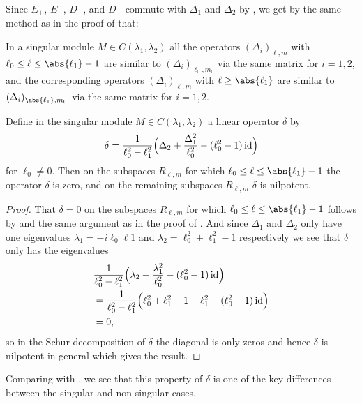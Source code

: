 Since $E_+$, $E_-$, $D_+$, and $D_-$ commute with $\Delta_1$ and $\Delta_2$ by , we get by the same method as in the proof of  that:

\begin{lemma}\label{lem:singmodDeltasimilar}
  In a singular module $M\in C(\lambda_1,\lambda_2)$ all the operators $(\Delta_i)_{\ell,m}$ with $\ell_0\leq \ell\leq \abs{\ell_1}-1$ are similar to $(\Delta_i)_{\ell_0,m_0}$ via the same matrix for $i=1,2$, and the corresponding operators $(\Delta_i)_{\ell,m}$ with $\ell\geq \abs{\ell_1}$ are similar to $(\Delta_i)_{\abs{\ell_1},m_0}$ via the same matrix for $i=1,2$.
\end{lemma}

\begin{lemma}\label{lem:Deltarelsing}
  Define in the singular module $M\in C(\lambda_1,\lambda_2)$ a linear operator $\delta$ by
  \begin{align}
    \delta = \dfrac{1}{\ell_0^2-\ell_1^2}\Bigl( \Delta_2 + \dfrac{\Delta_1^2}{\ell_0^2} - (\ell_0^2-1)\operatorname{id} \Bigr)
  \end{align}
  for $\ell_0\neq 0$. Then on the subspaces $R_{\ell,m}$ for which $\ell_0\leq \ell\leq \abs{\ell_1}-1$ the operator $\delta$ is zero, and on the remaining subspaces $R_{\ell,m}$ $\delta$ is nilpotent.
\end{lemma}
\begin{proof}
  That $\delta=0$ on the subspaces $R_{\ell,m}$ for which $\ell_0\leq \ell\leq \abs{\ell_1}-1$ follows by  and the same argument as in the proof of . And since $\Delta_1$ and $\Delta_2$ only have one eigenvalues $\lambda_1=-i\ell_0\ell1$ and $\lambda_2=\ell_0^2+\ell_1^2-1$ respectively we see that $\delta$ only has the eigenvalues
  \begin{align*}
    &\dfrac{1}{\ell_0^2-\ell_1^2}\Bigl( \lambda_2 + \dfrac{\lambda_1^2}{\ell_0^2} - (\ell_0^2-1)\operatorname{id} \Bigr) \\
    &=\dfrac{1}{\ell_0^2-\ell_1^2}\Bigl( \ell_0^2+\ell_1^2-1 - \ell_1^2 - (\ell_0^2-1)\operatorname{id} \Bigr) \\
    &=0,
  \end{align*}
  so in the Schur decomposition of $\delta$ the diagonal is only zeros and hence $\delta$ is nilpotent in general which gives the result.
\end{proof}

\begin{remark}
  Comparing  with , we see that this property of $\delta$ is one of the key differences between the singular and non-singular cases.
\end{remark}

